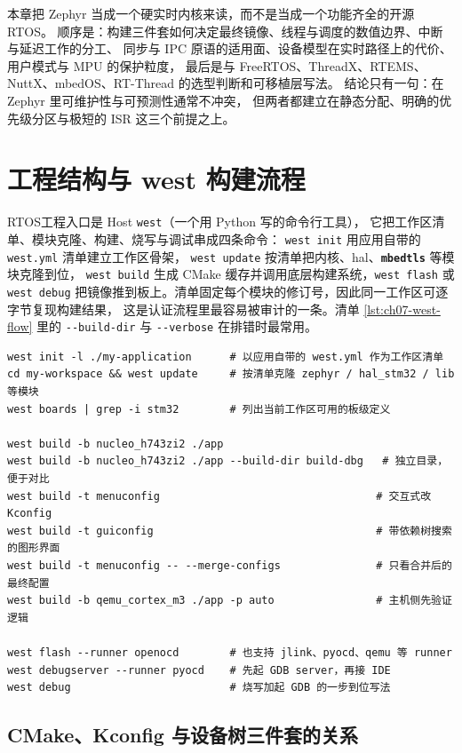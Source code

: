 \documentclass[12pt,a4paper,fontset=fandol]{ctexbook}
\newcommand{\Tp}[1]{\texttt{#1}}
\newcommand{\Opt}[1]{\texttt{-\/-#1}}
\newcommand{\Lib}[1]{\textbf{\texttt{#1}}}
\newcommand{\Lang}[1]{\textsf{#1}}
\newcommand{\PY}{\Lang{Python}}
\newcommand{\DomRtos}{\Lang{RTOS}}
\newcommand{\DomHost}{\Lang{Host}}
\begin{document}
本章把 Zephyr 当成一个硬实时内核来读，而不是当成一个功能齐全的开源 RTOS。
顺序是：构建三件套如何决定最终镜像、线程与调度的数值边界、中断与延迟工作的分工、
同步与 IPC 原语的适用面、设备模型在实时路径上的代价、用户模式与 MPU 的保护粒度，
最后是与 FreeRTOS、ThreadX、RTEMS、NuttX、mbedOS、RT-Thread 的选型判断和可移植层写法。
结论只有一句：在 Zephyr 里可维护性与可预测性通常不冲突，
但两者都建立在静态分配、明确的优先级分区与极短的 ISR 这三个前提之上。

\section{工程结构与 west 构建流程}
\label{sec:ch07-build}

\DomRtos{}工程入口是 \DomHost{} \Tp{west}（一个用 \PY{} 写的命令行工具），
它把工作区清单、模块克隆、构建、烧写与调试串成四条命令：
\Tp{west init} 用应用自带的 \Tp{west.yml} 清单建立工作区骨架，
\Tp{west update} 按清单把内核、hal、\Lib{mbedtls} 等模块克隆到位，
\Tp{west build} 生成 CMake 缓存并调用底层构建系统，\Tp{west flash} 或 \Tp{west debug}
把镜像推到板上。清单固定每个模块的修订号，因此同一工作区可逐字节复现构建结果，
这是认证流程里最容易被审计的一条。清单 \ref{lst:ch07-west-flow} 里的
\Opt{build-dir} 与 \Opt{verbose} 在排错时最常用。

\begin{lstlisting}[style=shellstyle,caption={Shell：west 工作区、构建与调试入口},label={lst:ch07-west-flow}]
west init -l ./my-application      # 以应用自带的 west.yml 作为工作区清单
cd my-workspace && west update     # 按清单克隆 zephyr / hal_stm32 / lib 等模块
west boards | grep -i stm32        # 列出当前工作区可用的板级定义

west build -b nucleo_h743zi2 ./app
west build -b nucleo_h743zi2 ./app --build-dir build-dbg   # 独立目录，便于对比
west build -t menuconfig                                  # 交互式改 Kconfig
west build -t guiconfig                                   # 带依赖树搜索的图形界面
west build -t menuconfig -- --merge-configs               # 只看合并后的最终配置
west build -b qemu_cortex_m3 ./app -p auto                # 主机侧先验证逻辑

west flash --runner openocd        # 也支持 jlink、pyocd、qemu 等 runner
west debugserver --runner pyocd    # 先起 GDB server，再接 IDE
west debug                         # 烧写加起 GDB 的一步到位写法
\end{lstlisting}

\subsection{CMake、Kconfig 与设备树三件套的关系}
\end{document}
